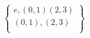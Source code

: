 \documentclass[preview]{standalone}
\begin{document}
\begin{align*}
\begin{Bmatrix}e,(0,1)(2,3)\\     (0,1),     (2,3)\\\end{Bmatrix}
\end{align*}
\end{document}
